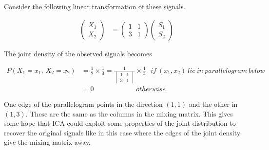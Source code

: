 \documentclass[11pt, a4paper]{article}
\begin{document}
Consider the following linear transformation of these signals.

\begin{align*}
	\begin{pmatrix} 
	X_1 \\ 
	X_2 
	\end{pmatrix} & = 
	\begin{pmatrix} 
	1             & 1 \\ 
	3             & 1 
	\end{pmatrix}
	\begin{pmatrix} 
	S_1 \\ 
	S_2
	\end{pmatrix}
\end{align*}

The joint density of the observed signals becomes

\begin{align*}
	P(X_1=x_1,\ X_2=x_2) & = \frac{1}{2} \times \frac{1}{4}                                     
	= \frac{1}{\begin{vmatrix} 
	1                    & 1                                                                    \\ 
	3                    & 1                                                                    
	\end{vmatrix}} \times \frac{1}{4} \ \ \ if\ (x_1, x_2)\ lie\ in\  parallelogram\ below \\
	                     & = 0\ \ \ \ \ \ \ \ \ \ \ \ \ \ \ \ \ \ \ \ \ \ \ \ \ \ \ \ otherwise 
\end{align*}


\begin{figure}[htbp]
	\centering
\end{figure}

\FloatBarrier

One edge of the parallelogram points in the direction $(1, 1)$ and the other in $(1, 3)$. These are the same as the columns in the mixing matrix. This gives some hope that ICA could exploit some properties of the joint distribution to recover the original signals like in this case where the edges of the joint density give the mixing matrix away. 
\end{document}
